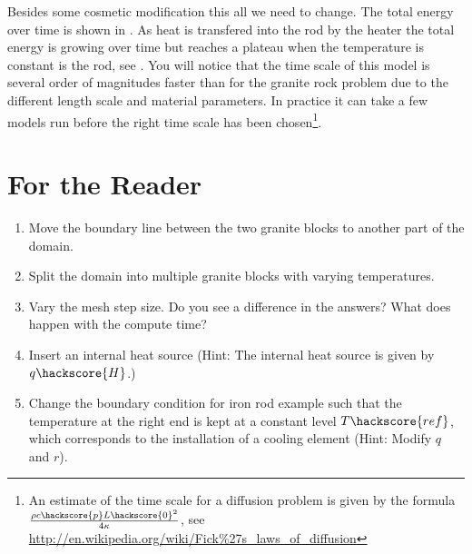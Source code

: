 Besides some cosmetic modification this all we need to change. The total energy
over time is shown in . As heat
is transfered into the rod by the heater the total energy is growing over time
but reaches a plateau 
when the temperature is constant is the rod, see . 
You will notice that the time scale of this model is several order of magnitudes
faster than
for the granite rock problem due to the different length scale and material
parameters. 
In practice it can take a few models run before the right time scale has been
chosen\footnote{An estimate of the
time scale for a diffusion problem is given by the formula $\frac{\rho
c\hackscore{p} L\hackscore{0}^2}{4 \kappa}$, see
\url{http://en.wikipedia.org/wiki/Fick\%27s_laws_of_diffusion}}.






\section{For the Reader}
\begin{enumerate}
 \item Move the boundary line between the two granite blocks to another part of
the domain.
 \item Split the domain into multiple granite blocks with varying temperatures.
 \item Vary the mesh step size. Do you see a difference in the answers? What
does happen with the compute time?
 \item Insert an internal heat source (Hint: The internal heat source is given
by $q\hackscore{H}$.)
 \item Change the boundary condition for iron rod example such that the
temperature 
 at the right end is kept at a constant level $T\hackscore{ref}$, which
corresponds to the installation of a cooling element (Hint: Modify $q$ and
$r$). 
\end{enumerate}


